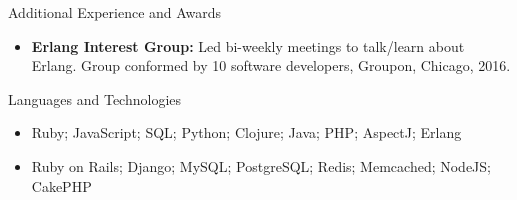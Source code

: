 \documentclass[]{mcdowellcv}
\begin{document}
	\begin{cvsection}{Additional Experience and Awards}
		\begin{cvsubsection}{}{}{}	
			\begin{itemize}
			        \item \textbf{Erlang Interest Group:} Led bi-weekly meetings to talk/learn about Erlang. Group conformed by 10 software developers, Groupon, Chicago, 2016.
			\end{itemize}
		\end{cvsubsection}
	\end{cvsection}
	
	\begin{cvsection}{Languages and Technologies}
		\begin{cvsubsection}{}{}{}	
			\begin{itemize}
				\item Ruby; JavaScript; SQL; Python; Clojure; Java; PHP; AspectJ; Erlang 
				\item Ruby on Rails; Django; MySQL; PostgreSQL; Redis; Memcached; NodeJS; CakePHP
			\end{itemize}
		\end{cvsubsection}
	\end{cvsection}
\end{document}
